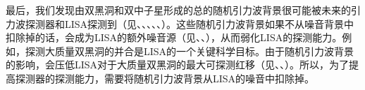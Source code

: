 最后，我们发现由双黑洞和双中子星形成的总的随机引力波背景很可能被未来的引力波探测器\lvc 和LISA探测到（见、、、、、）。这些随机引力波背景如果不从噪音背景中扣除掉的话，会成为LISA的额外噪音源（见、、），从而弱化LISA的探测能力。例如，探测大质量双黑洞的并合是LISA的一个关键科学目标。由于随机引力波背景的影响，会压低LISA对于大质量双黑洞的最大可探测红移（见、、）。所以，为了提高探测器的探测能力，需要将随机引力波背景从LISA的噪音中扣除掉。